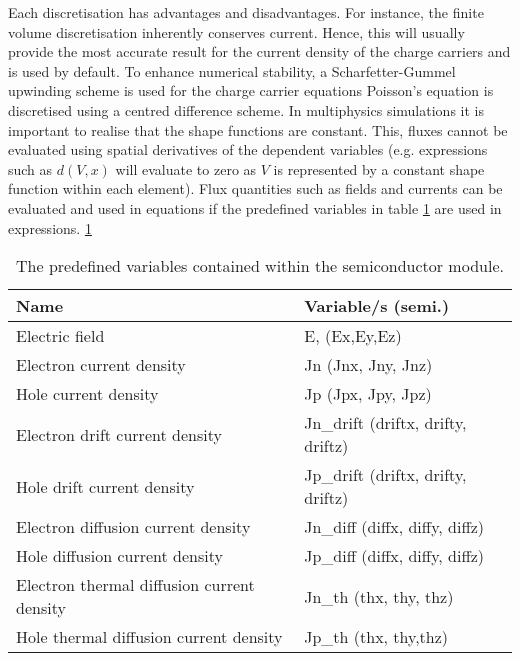 Each discretisation has advantages and disadvantages. For instance, the finite volume discretisation inherently conserves current. Hence, this will usually provide the most accurate result for the current density of the charge carriers and is used by default. To enhance numerical stability, a Scharfetter-Gummel upwinding scheme is used for the charge carrier equations Poisson's equation is discretised using a centred difference scheme. In multiphysics simulations it is important to realise that the shape functions are constant. This, fluxes cannot be evaluated using spatial derivatives of the dependent variables (e.g. expressions such as $d\left(V,x\right)$ will evaluate to zero as $V$ is represented by a constant shape function within each element). Flux quantities such as fields and currents can be evaluated and used in equations if the predefined variables in table \ref{tab:predefined_variables} are used in expressions. \ref{tab:predefined_variables}


\begin{table}[h]
	\begin{tabular}{|l|l|}
		\hline
		Name                                       & Variable/s (semi.)                 \\ \hline
		Electric field                             & E, (Ex,Ey,Ez)                      \\ \hline
		Electron current density                   & Jn (Jnx, Jny, Jnz)                 \\ \hline
		Hole current density                       & Jp (Jpx, Jpy, Jpz)                 \\ \hline
		Electron drift current density             & Jn\_drift (driftx, drifty, driftz) \\ \hline
		Hole drift current density                 & Jp\_drift (driftx, drifty, driftz) \\ \hline
		Electron diffusion current density         & Jn\_diff (diffx, diffy, diffz)     \\ \hline
		Hole diffusion current density             & Jp\_diff (diffx, diffy, diffz)     \\ \hline
		Electron thermal diffusion current density & Jn\_th (thx, thy, thz)             \\ \hline
		Hole thermal diffusion current density     & Jp\_th (thx, thy,thz)              \\ \hline
	\end{tabular}
\caption{The predefined variables contained within the semiconductor module.}
\label{tab:predefined_variables}
\end{table}

